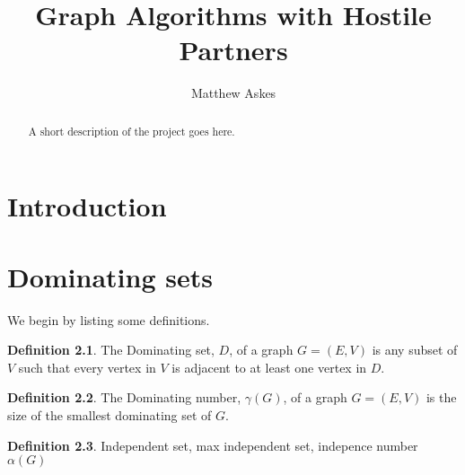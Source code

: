 \documentclass[11pt
              , a4paper
              , twoside
              , openright
              ]{report}
\title{Graph Algorithms with Hostile Partners}
\author{Matthew Askes}
\date{}
\theoremstyle{definition}
\newtheorem*{definition}{Definition}
\begin{document}
\frontmatter



\begin{abstract}

A short description of the project goes here.

\end{abstract}


\maketitle



\tableofcontents



\mainmatter


%
%
%
%
\chapter{Introduction}

\chapter{Dominating sets}

We begin by listing some definitions.

\begin{definition}
    The Dominating set, $D$, of a graph $G=(E,V)$ is any subset of $V$ such that every vertex in $V$ is adjacent to at least one vertex in $D$.
\end{definition}

\begin{definition}
    The Dominating number, $\gamma(G)$, of a graph $G=(E,V)$ is the size of the smallest dominating set of $G$.
\end{definition}

\begin{definition}
    Independent set, max independent set, indepence number $\alpha(G)$
\end{definition}
\end{document}
